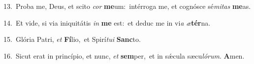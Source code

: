 {\numbfont\textcolor{\numbcolor}{13.}}~Proba me, Deus, et scito \textit{cor} \textbf{me}\-um:~\star intérroga me, et cognósce sé\-\textit{mi}\-\textit{tas} \textbf{me}\-as.\par
{\numbfont\textcolor{\numbcolor}{14.}}~Et vide, si via iniquitátis \textit{in} \textbf{me} est:~\star et deduc me in vi\textit{a} \textit{æ}\-\textbf{tér}na.\par
{\numbfont\textcolor{\numbcolor}{15.}}~Glória Patri, \textit{et} \textbf{Fí}\-lio,~\star et Spirí\-\textit{tu}\-\textit{i} \textbf{Sanc}\-to.\par
{\numbfont\textcolor{\numbcolor}{16.}}~Sicut erat in princípio, et nunc, \textit{et} \textbf{sem}\-per,~\star et in sǽcula sæcu\-\textit{ló}\-\textit{rum}. \textbf{A}\-men.\par
